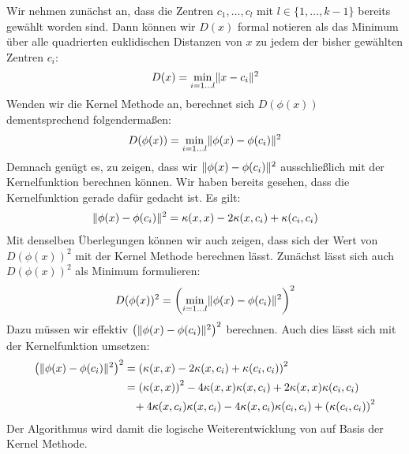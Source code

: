 Wir nehmen zunächst an, dass die Zentren $c_1, \dots, c_l$ mit $l \in \{ 1, \dots, k-1 \}$ bereits gewählt worden sind.
Dann können wir $D(x)$ formal notieren als das Minimum über alle quadrierten euklidischen Distanzen von $x$ zu jedem der bisher
gewählten Zentren $c_i$:
\[ D(x) = \min_{i = 1 \dots l} \lVert {x} - {c_i} \rVert^2 \]
Wenden wir die Kernel Methode an, berechnet sich $D(\phi(x))$ dementsprechend folgendermaßen:
\[ D(\phi(x)) = \min_{i = 1 \dots l} \lVert {\phi(x)} - {\phi(c_i)} \rVert^2 \]
Demnach genügt es, zu zeigen, dass wir $\lVert {\phi(x)} - {\phi(c_i)} \rVert^2$ ausschließlich mit der Kernelfunktion berechnen
können. Wir haben bereits gesehen, dass die Kernelfunktion gerade dafür gedacht ist. Es gilt:
\begin{align}
	\lVert {\phi(x)} - {\phi(c_i)} \rVert^2 = \kappa(x,x) - 2 \kappa(x,c_i) + \kappa(c_i,c_i)
\end{align}
Mit denselben Überlegungen können wir auch zeigen, dass sich der Wert von $D(\phi(x))^2$ mit der Kernel Methode berechnen lässt.
Zunächst lässt sich auch $D(\phi(x))^2$ als Minimum formulieren:
\[ D(\phi(x))^2 = \left( \min_{i = 1 \dots l} \lVert {\phi(x)} - {\phi(c_i)} \rVert^2 \right)^2 \]
Dazu müssen wir effektiv $\left( \lVert {\phi(x)} - {\phi(c_i)} \rVert^2 \right)^2$ berechnen. Auch dies lässt sich mit der
Kernelfunktion umsetzen:
\begin{align}
\label{formula:kkmpp}
	\left( \lVert {\phi(x)} - {\phi(c_i)} \rVert^2 \right)^2 &= \left( \kappa(x,x) - 2 \kappa(x,c_i) + \kappa(c_i,c_i) \right)^2 \nonumber \\
	&= \left(\kappa(x,x)\right)^2 - 4 \kappa(x,x) \kappa(x,c_i) + 2 \kappa(x,x) \kappa(c_i,c_i) \nonumber \\
	& \; \; \; + 4 \kappa(x,c_i) \kappa(x,c_i) - 4 \kappa(x,c_i) \kappa(c_i,c_i) + \left(\kappa(c_i,c_i)\right)^2
\end{align}
Der Algorithmus \kkmpp{} wird damit die logische Weiterentwicklung von \kmpp{} auf Basis der Kernel Methode.

